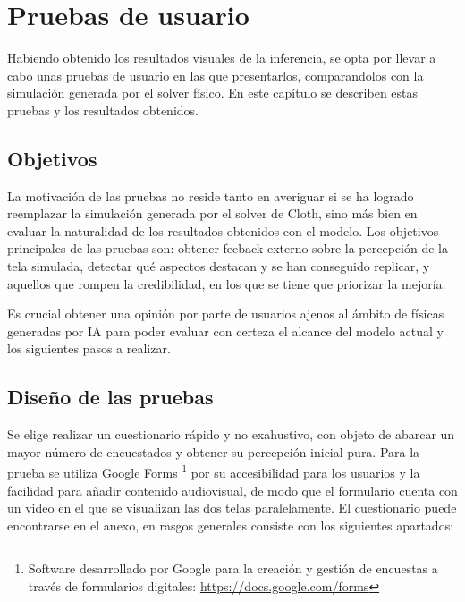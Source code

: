 \section{Pruebas de usuario}
\label{sec:PruebaTesters}

Habiendo obtenido los resultados visuales de la inferencia, se opta por llevar a cabo unas pruebas de usuario en las que presentarlos, comparandolos con la simulación generada por el solver físico. En este capítulo se describen estas pruebas y los resultados obtenidos.

\subsection{Objetivos}
La motivación de las pruebas no reside tanto en averiguar si se ha logrado reemplazar la simulación generada por el solver de Cloth, sino más bien en evaluar la naturalidad de los resultados obtenidos con el modelo. Los objetivos principales de las pruebas son: obtener feeback externo sobre la percepción de la tela simulada, detectar qué aspectos destacan y se han conseguido replicar, y aquellos que rompen la credibilidad, en los que se tiene que priorizar la mejoría.

Es crucial obtener una opinión por parte de usuarios ajenos al ámbito de físicas generadas por IA para poder evaluar con certeza el alcance del modelo actual y los siguientes pasos a realizar.

\subsection{Diseño de las pruebas}
Se elige realizar un cuestionario rápido y no exahustivo, con objeto de abarcar un mayor número de encuestados y obtener su percepción inicial pura. Para la prueba se utiliza Google Forms \footnote{ Software desarrollado por Google para la creación y gestión de encuestas a través de formularios digitales: \url{https://docs.google.com/forms}} por su accesibilidad para los usuarios y la facilidad para añadir contenido audiovisual, de modo que el formulario cuenta con un video en el que se visualizan las dos telas paralelamente. El cuestionario puede encontrarse en el anexo, en rasgos generales consiste con los siguientes apartados:

